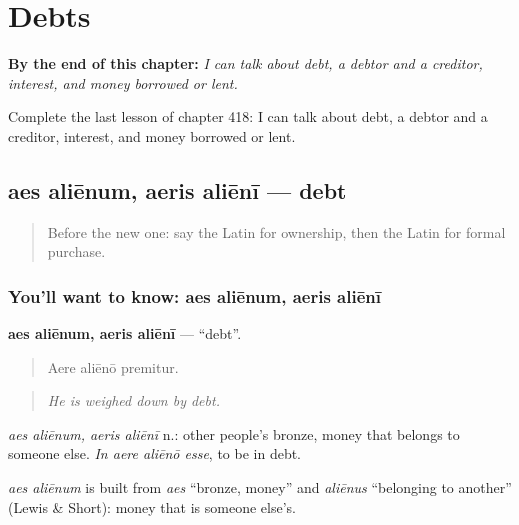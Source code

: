 
\chapter{Debts}
\label{ch:la-debts}

\begin{chapteropening}
\textbf{By the end of this chapter:} \emph{I can talk about debt, a debtor and a creditor, interest, and money borrowed or lent.}

Complete the last lesson of chapter 418: I can talk about debt, a debtor and a creditor, interest, and money borrowed or lent.
\end{chapteropening}

\section[aes aliēnum, aeris aliēnī]{aes aliēnum, aeris aliēnī — debt}

\label{lesson:LA-C418-aes-alienum}



\begin{quote}
Before the new one: say the Latin for ownership, then the Latin for formal purchase.
\end{quote}

\subsection*{You'll want to know: aes aliēnum, aeris aliēnī}
\textbf{aes aliēnum, aeris aliēnī} — \textquotedblleft{}debt\textquotedblright{}.

\begin{quote}
Aere aliēnō premitur.
\end{quote}

\begin{quote}
\emph{He is weighed down by debt.}
\end{quote}

\emph{aes aliēnum, aeris aliēnī} n.: other people's bronze, money that belongs to someone else. \emph{In aere aliēnō esse}, to be in debt.

\begin{cousinweb}
\emph{aes aliēnum} is built from \emph{aes} \textquotedblleft{}bronze, money\textquotedblright{} and \emph{aliēnus} \textquotedblleft{}belonging to another\textquotedblright{} (Lewis \& Short): money that is someone else's.
\end{cousinweb}

